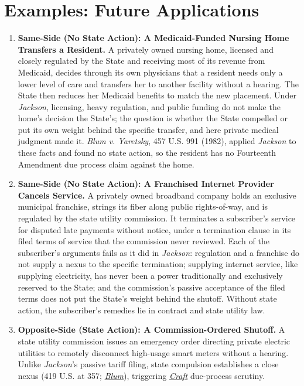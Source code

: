 \documentclass[12pt]{article}
\begin{document}
\section{Examples: Future Applications}
\begin{enumerate}

\item \textbf{Same-Side (No State Action): A Medicaid-Funded Nursing Home Transfers a Resident.} A privately owned nursing home, licensed and closely regulated by the State and receiving most of its revenue from Medicaid, decides through its own physicians that a resident needs only a lower level of care and transfers her to another facility without a hearing. The State then reduces her Medicaid benefits to match the new placement. Under \textit{Jackson}, licensing, heavy regulation, and public funding do not make the home's decision the State's; the question is whether the State compelled or put its own weight behind the specific transfer, and here private medical judgment made it. \textit{Blum v. Yaretsky}, 457 U.S. 991 (1982), applied \textit{Jackson} to these facts and found no state action, so the resident has no Fourteenth Amendment due process claim against the home.

\item \textbf{Same-Side (No State Action): A Franchised Internet Provider Cancels Service.} A privately owned broadband company holds an exclusive municipal franchise, strings its fiber along public rights-of-way, and is regulated by the state utility commission. It terminates a subscriber's service for disputed late payments without notice, under a termination clause in its filed terms of service that the commission never reviewed. Each of the subscriber's arguments fails as it did in \textit{Jackson}: regulation and a franchise do not supply a nexus to the specific termination; supplying internet service, like supplying electricity, has never been a power traditionally and exclusively reserved to the State; and the commission's passive acceptance of the filed terms does not put the State's weight behind the shutoff. Without state action, the subscriber's remedies lie in contract and state utility law.

\item \textbf{Opposite-Side (State Action): A Commission-Ordered Shutoff.} A state utility commission issues an emergency order directing private electric utilities to remotely disconnect high-usage smart meters without a hearing. Unlike \emph{Jackson}'s passive tariff filing, state compulsion establishes a close nexus (419 U.S. at 357; \href{https://supreme.justia.com/cases/federal/us/457/991/}{\emph{Blum}}), triggering \href{https://supreme.justia.com/cases/federal/us/436/1/}{\emph{Craft}} due-process scrutiny.


\end{enumerate}
\end{document}
